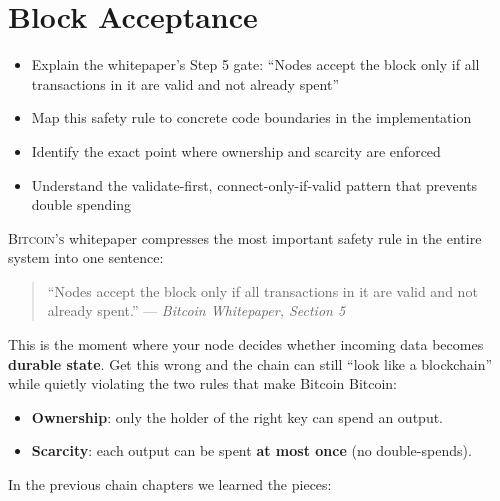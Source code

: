 \chapter{Block Acceptance}
\label{ch:block-acceptance}

\begin{learnbox}
\begin{itemize}
  \item Explain the whitepaper's Step 5 gate: ``Nodes accept the block only if all transactions in it are valid and not already spent''
  \item Map this safety rule to concrete code boundaries in the implementation
  \item Identify the exact point where ownership and scarcity are enforced
  \item Understand the validate-first, connect-only-if-valid pattern that prevents double spending
\end{itemize}
\end{learnbox}

\lettrine{B}{itcoin's} whitepaper compresses the most important safety rule in the entire system into one sentence:

\begin{quote}
``Nodes accept the block only if all transactions in it are valid and not already spent.''
--- \emph{Bitcoin Whitepaper, Section 5}
\end{quote}

This is the moment where your node decides whether incoming data becomes \textbf{durable state}. Get this wrong and the chain can still ``look like a blockchain'' while quietly violating the two rules that make Bitcoin Bitcoin:

\begin{itemize}
  \item \textbf{Ownership}: only the holder of the right key can spend an output.
  \item \textbf{Scarcity}: each output can be spent \textbf{at most once} (no double-spends).
\end{itemize}

In the previous chain chapters we learned the pieces:


